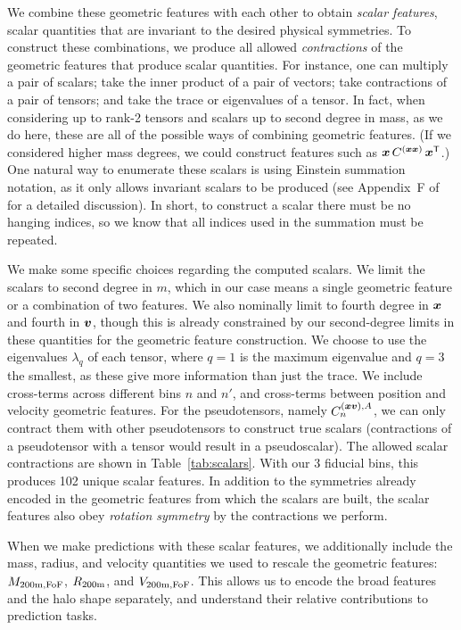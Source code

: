 We combine these geometric features with each other to obtain \emph{scalar features}, scalar quantities that are invariant to the desired physical symmetries.
To construct these combinations, we produce all allowed \emph{contractions} of the geometric features that produce scalar quantities.
For instance, one can multiply a pair of scalars; take the inner product of a pair of vectors; take contractions of a pair of tensors; and take the trace or eigenvalues of a tensor.
In fact, when considering up to rank-2 tensors and scalars up to second degree in mass, as we do here, these are all of the possible ways of combining geometric features.
(If we considered higher mass degrees, we could construct features such as $\bm{x} \, C^{(\bm{x}\bm{x})} \, \bm{x}^{\mathsf{T}}$.)
One natural way to enumerate these scalars is using Einstein summation notation, as it only allows invariant scalars to be produced (see Appendix~F of \citealt{Villar2021a} for a detailed discussion).
In short, to construct a scalar there must be no hanging indices, so we know that all indices used in the summation must be repeated.

We make some specific choices regarding the computed scalars.
We limit the scalars to second degree in $m$, which in our case means a single geometric feature or a combination of two features.
We also nominally limit to fourth degree in $\bm{x}$ and fourth in $\bm{v}$, though this is already constrained by our second-degree limits in these quantities for the geometric feature construction.
We choose to use the eigenvalues $\lambda_q$ of each tensor, where $q=1$ is the maximum eigenvalue and $q=3$ the smallest, as these give more information than just the trace.
We include cross-terms across different bins $n$ and $n'$, and cross-terms between position and velocity geometric features.
For the pseudotensors, namely $C^{(\bm{x}\bm{v}),A}_n$, we can only contract them with other pseudotensors to construct true scalars (contractions of a pseudotensor with a tensor would result in a pseudoscalar).
The allowed scalar contractions are shown in Table~\ref{tab:scalars}.
With our 3 fiducial bins, this produces 102 unique scalar features.
In addition to the symmetries already encoded in the geometric features from which the scalars are built, the scalar features also obey \emph{rotation symmetry} by the contractions we perform.

When we make predictions with these scalar features, we additionally include the mass, radius, and velocity quantities we used to rescale the geometric features: $M_\mathrm{200m,FoF}$, $R_\mathrm{200m}$, and $V_\mathrm{200m,FoF}$. 
This allows us to encode the broad features and the halo shape separately, and understand their relative contributions to prediction tasks.

